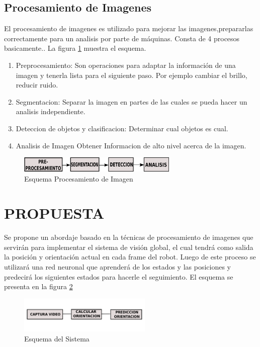 \documentclass[conference]{IEEEtran}
\begin{document}
 \subsection{Procesamiento de Imagenes}
El procesamiento de imagenes es utilizado para mejorar las imagenes,prepararlas correctamente para un analisis por parte de m\'aquinas. Consta de 4 procesos basicamente.\cite{art_red1}. La figura \ref{fig_img5} muestra el esquema.
\begin{enumerate}
\item Preprocesamiento: Son operaciones para adaptar la informaci\'on de una imagen y tenerla lista para el siguiente paso. Por ejemplo cambiar el brillo, reducir ruido.
\item Segmentacion: Separar la imagen en partes de las cuales se pueda hacer un analisis independiente.
\item Deteccion de objetos y clasificacion: Determinar cual objetos es cual.
\item Analisis de Imagen Obtener Informacion de alto nivel acerca de la imagen.
\end{enumerate}
 \begin{figure}
	\centering
	\includegraphics[width=3.0in]{imagen5.pdf}
	\caption{Esquema Procesamiento de Imagen}
	\label{fig_img5}
\end{figure}
\section{PROPUESTA}
Se propone un abordaje basado en la t\'ecnicas de procesamiento de imagenes que servir\'an para implementar el sistema de visi\'on global, el cual tendr\'a como salida la posici\'on y orientaci\'on actual en cada frame del robot. Luego de este proceso se utilizar\'a una red neuronal  que aprender\'a de los estados y las posiciones y predecir\'a los siguientes estados para hacerle el seguimiento. El esquema se presenta en la figura \ref{fig_esqsis} \\
	\begin{figure}
	\centering
	\includegraphics[width=2.5in]{esquema.pdf}
	
	\caption{Esquema del Sistema}
	\label{fig_esqsis}
\end{figure}
\end{document}

